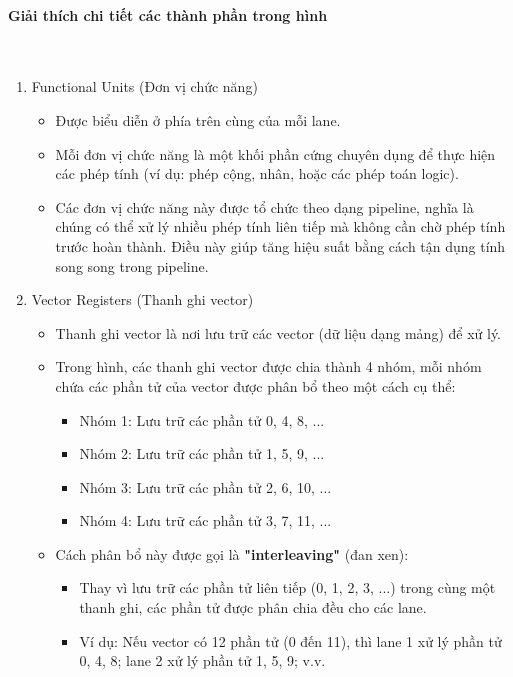 \documentclass[a4paper]{article}
\begin{document}
\paragraph{Giải thích chi tiết các thành phần trong hình}\leavevmode\\
\begin{enumerate}
    \item Functional Units (Đơn vị chức năng)
    \begin{itemize}
        \item Được biểu diễn ở phía trên cùng của mỗi lane.
        \item Mỗi đơn vị chức năng là một khối phần cứng chuyên dụng để thực hiện các phép tính (ví dụ: phép cộng, nhân, hoặc các phép toán logic).
        \item Các đơn vị chức năng này được tổ chức theo dạng pipeline, nghĩa là chúng có thể xử lý nhiều phép tính liên tiếp mà không cần chờ phép tính trước hoàn thành. Điều này giúp tăng hiệu suất bằng cách tận dụng tính song song trong pipeline.
    \end{itemize}
    \item Vector Registers (Thanh ghi vector)
    \begin{itemize}
        \item Thanh ghi vector là nơi lưu trữ các vector (dữ liệu dạng mảng) để xử lý.
        \item Trong hình, các thanh ghi vector được chia thành 4 nhóm, mỗi nhóm chứa các phần tử của vector được phân bổ theo một cách cụ thể:
        \begin{itemize}
            \item Nhóm 1: Lưu trữ các phần tử 0, 4, 8, ...
            \item Nhóm 2: Lưu trữ các phần tử 1, 5, 9, ...
            \item Nhóm 3: Lưu trữ các phần tử 2, 6, 10, ...
            \item Nhóm 4: Lưu trữ các phần tử 3, 7, 11, ...
        \end{itemize}
        \item Cách phân bổ này được gọi là \textbf{"interleaving"} (đan xen):
        \begin{itemize}
            \item Thay vì lưu trữ các phần tử liên tiếp (0, 1, 2, 3, ...) trong cùng một thanh ghi, các phần tử được phân chia đều cho các lane.
            \item Ví dụ: Nếu vector có 12 phần tử (0 đến 11), thì lane 1 xử lý phần tử 0, 4, 8; lane 2 xử lý phần tử 1, 5, 9; v.v.

\end{itemize}
\end{itemize}
\end{enumerate}
\end{document}

